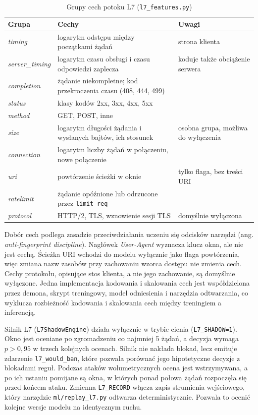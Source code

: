 \documentclass[a4paper,12pt]{article}
\begin{document}
\begin{table}[H]
\centering
\small
\caption{Grupy cech potoku L7 (\texttt{l7\_features.py})}\label{tab:cechy_l7}
\begin{tabularx}{\linewidth}{@{}L{2.6cm}L{4.6cm}Y@{}}
\toprule
Grupa & Cechy & Uwagi \\
\midrule
\textit{timing} & logarytm odstępu między początkami żądań & strona klienta \\
\textit{server\_timing} & logarytm czasu obsługi i czasu odpowiedzi zaplecza & koduje także obciążenie serwera \\
\textit{completion} & żądanie niekompletne; kod przekroczenia czasu (408, 444, 499) & \\
\textit{status} & klasy kodów 2xx, 3xx, 4xx, 5xx & \\
\textit{method} & GET, POST, inne & \\
\textit{size} & logarytm długości żądania i wysłanych bajtów, ich stosunek & osobna grupa, możliwa do wyłączenia \\
\textit{connection} & logarytm liczby żądań w połączeniu, nowe połączenie & \\
\textit{uri} & powtórzenie ścieżki w oknie & tylko flaga, bez treści URI \\
\textit{ratelimit} & żądanie opóźnione lub odrzucone przez \texttt{limit\_req} & \\
\textit{protocol} & HTTP/2, TLS, wznowienie sesji TLS & domyślnie wyłączona \\
\bottomrule
\end{tabularx}
\end{table}

Dobór cech podlega zasadzie przeciwdziałania uczeniu się odcisków narzędzi (ang. \textit{anti-fingerprint discipline}). Nagłówek \textit{User-Agent} wyznacza klucz okna, ale nie jest cechą. Ścieżka URI wchodzi do modelu wyłącznie jako flaga powtórzenia, więc zmiana nazw zasobów przy zachowaniu wzorca dostępu nie zmienia cech. Cechy protokołu, opisujące stos klienta, a nie jego zachowanie, są domyślnie wyłączone. Jedna implementacja kodowania i skalowania cech jest współdzielona przez demona, skrypt treningowy, model odniesienia i narzędzia odtwarzania, co wyklucza rozbieżność kodowania i skalowania cech między treningiem a inferencją.

Silnik L7 (\texttt{L7ShadowEngine}) działa wyłącznie w trybie cienia (\texttt{L7\_SHADOW=1}). Okno jest oceniane po zgromadzeniu co najmniej 5 żądań, a decyzja wymaga $p>0{,}95$ w trzech kolejnych ocenach. Silnik nie nakłada blokad, lecz emituje zdarzenie \texttt{l7\_would\_ban}, które pozwala porównać jego hipotetyczne decyzje z blokadami reguł. Podczas ataków wolumetrycznych ocena jest wstrzymywana, a po ich ustaniu pomijane są okna, w których ponad połowa żądań rozpoczęła się przed końcem ataku. Zmienna \texttt{L7\_RECORD} włącza zapis strumienia wejściowego, który narzędzie \texttt{ml/replay\_l7.py} odtwarza deterministycznie. Pozwala to ocenić kolejne wersje modelu na identycznym ruchu.
\end{document}
